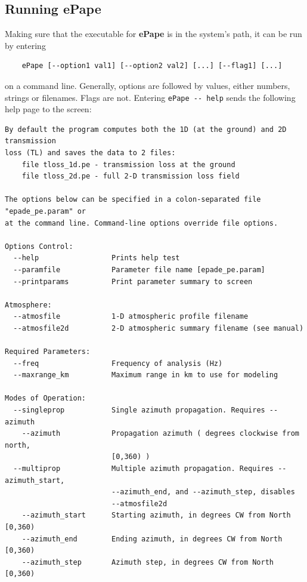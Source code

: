 \subsection{Running ePape}
\label{sec: running ePape}

Making sure that the executable for {\bf ePape} is in the system's path, it can be run by entering 
\begin{verbatim} 
    ePape [--option1 val1] [--option2 val2] [...] [--flag1] [...] 
\end{verbatim}
on a command line. Generally, options are followed by values, either numbers, strings or filenames. Flags are not. 
Entering \verb"ePape -- help" sends the following help page to the screen:  

\begin{verbatim}
By default the program computes both the 1D (at the ground) and 2D transmission
loss (TL) and saves the data to 2 files:
    file tloss_1d.pe - transmission loss at the ground
    file tloss_2d.pe - full 2-D transmission loss field

The options below can be specified in a colon-separated file "epade_pe.param" or
at the command line. Command-line options override file options.

Options Control:
  --help                 Prints help test
  --paramfile            Parameter file name [epade_pe.param]
  --printparams          Print parameter summary to screen

Atmosphere:
  --atmosfile            1-D atmospheric profile filename
  --atmosfile2d          2-D atmospheric summary filename (see manual)

Required Parameters:
  --freq                 Frequency of analysis (Hz)
  --maxrange_km          Maximum range in km to use for modeling

Modes of Operation:
  --singleprop           Single azimuth propagation. Requires --azimuth
    --azimuth            Propagation azimuth ( degrees clockwise from north,
                         [0,360) )
  --multiprop            Multiple azimuth propagation. Requires --azimuth_start,
                         --azimuth_end, and --azimuth_step, disables
                         --atmosfile2d
    --azimuth_start      Starting azimuth, in degrees CW from North [0,360)
    --azimuth_end        Ending azimuth, in degrees CW from North [0,360)
    --azimuth_step       Azimuth step, in degrees CW from North [0,360)


\end{verbatim}
